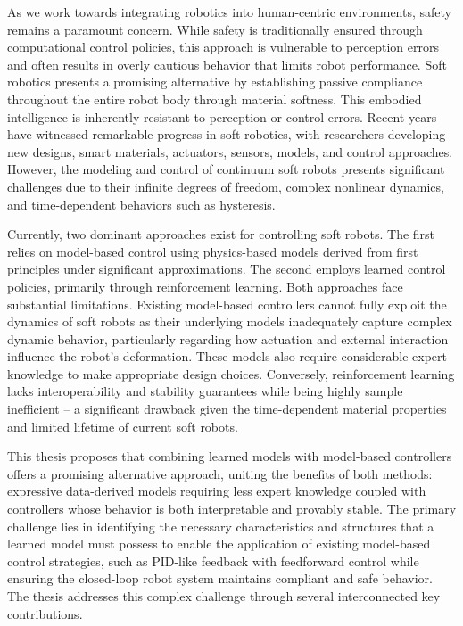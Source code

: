 As we work towards integrating robotics into human-centric environments, safety remains a paramount concern. While safety is traditionally ensured through computational control policies, this approach is vulnerable to perception errors and often results in overly cautious behavior that limits robot performance. Soft robotics presents a promising alternative by establishing passive compliance throughout the entire robot body through material softness. This embodied intelligence is inherently resistant to perception or control errors. Recent years have witnessed remarkable progress in soft robotics, with researchers developing new designs, smart materials, actuators, sensors, models, and control approaches. However, the modeling and control of continuum soft robots presents significant challenges due to their infinite degrees of freedom, complex nonlinear dynamics, and time-dependent behaviors such as hysteresis.

Currently, two dominant approaches exist for controlling soft robots. The first relies on model-based control using physics-based models derived from first principles under significant approximations. The second employs learned control policies, primarily through reinforcement learning. Both approaches face substantial limitations. Existing model-based controllers cannot fully exploit the dynamics of soft robots as their underlying models inadequately capture complex dynamic behavior, particularly regarding how actuation and external interaction influence the robot's deformation. These models also require considerable expert knowledge to make appropriate design choices. Conversely, reinforcement learning lacks interoperability and stability guarantees while being highly sample inefficient -- a significant drawback given the time-dependent material properties and limited lifetime of current soft robots.

This thesis proposes that combining learned models with model-based controllers offers a promising alternative approach, uniting the benefits of both methods: expressive data-derived models requiring less expert knowledge coupled with controllers whose behavior is both interpretable and provably stable. The primary challenge lies in identifying the necessary characteristics and structures that a learned model must possess to enable the application of existing model-based control strategies, such as PID-like feedback with feedforward control while ensuring the closed-loop robot system maintains compliant and safe behavior.
The thesis addresses this complex challenge through several interconnected key contributions. 

